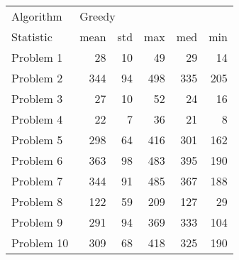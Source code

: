 \begin{tabular}{lrrrrr}
\toprule
Algorithm & \multicolumn{5}{l}{Greedy} \\
Statistic &   mean & std &  max &  med &  min \\
\midrule
Problem 1  &     28 &  10 &   49 &   29 &   14 \\
Problem 2  &    344 &  94 &  498 &  335 &  205 \\
Problem 3  &     27 &  10 &   52 &   24 &   16 \\
Problem 4  &     22 &   7 &   36 &   21 &    8 \\
Problem 5  &    298 &  64 &  416 &  301 &  162 \\
Problem 6  &    363 &  98 &  483 &  395 &  190 \\
Problem 7  &    344 &  91 &  485 &  367 &  188 \\
Problem 8  &    122 &  59 &  209 &  127 &   29 \\
Problem 9  &    291 &  94 &  369 &  333 &  104 \\
Problem 10 &    309 &  68 &  418 &  325 &  190 \\
\bottomrule
\end{tabular}
